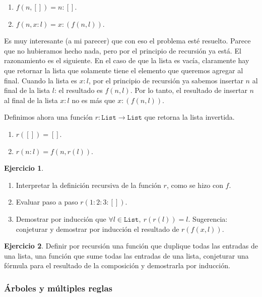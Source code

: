 \documentclass[a4paper, 12pt]{report}
\theoremstyle{definition}
\newtheorem{ejercicio}{Ejercicio}[section]
\begin{document}
\begin{enumerate}
	\item $f(n,[]) = n:[]$.
	\item $f(n,x:l) = x:(f(n,l))$.
\end{enumerate}
Es muy interesante (a mi parecer) que con eso el problema esté resuelto. Parece que no hubieramos hecho nada, pero por el principio de recursión ya está. El razonamiento es el siguiente. En el caso de que la lista es vacía, claramente hay que retornar la lista que solamente tiene el elemento que queremos agregar al final. Cuando la lista es $x:l$, por el principio de recursión ya sabemos insertar $n$ al final de la lista $l$: el  resultado es $f(n,l)$. Por lo tanto, el resultado de insertar $n$ al final de la lista $x:l$ no es más que $x:(f(n,l))$.

Definimos ahora una función $r:\mathtt{List}\to\mathtt{List}$ que retorna la lista invertida.
\begin{enumerate}
	\item $r([]) = []$.
	\item $r(n:l) = f(n,r(l))$.
\end{enumerate}

\begin{ejercicio}
	\begin{enumerate}
		\item Interpretar la definición recursiva de la función $r$, como se hizo con $f$.
		\item Evaluar paso a paso $r(1:2:3:[])$.
		\item Demostrar por inducción que $\forall l\in\mathtt{List},~r(r(l))=l$. Sugerencia: conjeturar y demostrar por inducción el resultado de $r(f(x,l))$.
	\end{enumerate}
\end{ejercicio}
\begin{ejercicio}
	Definir por recursión  una función que duplique todas las entradas de una lista, una función que sume todas las entradas de una lista, conjeturar una fórmula para el resultado de la composición y demostrarla por inducción.
\end{ejercicio}

\subsubsection{Árboles y múltiples reglas}
\end{document}
